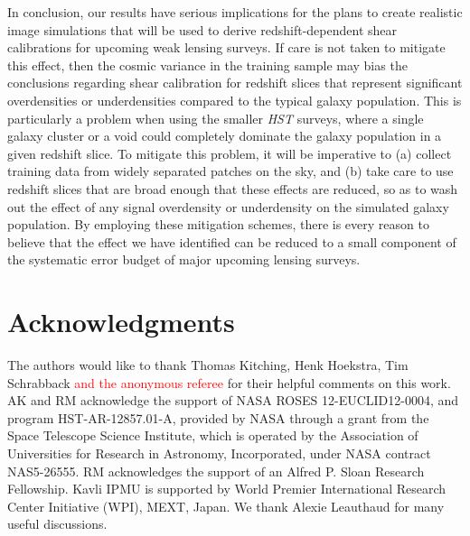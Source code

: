 \documentclass[twocolumn,useAMS,usenatbib]{mn2e}
\newcommand{\new}[1]{{\textcolor{red}{#1}}}
\begin{document}
In conclusion, our results have serious implications for the plans to
create realistic image simulations that will be used to derive
redshift-dependent shear calibrations for upcoming weak lensing
surveys.  If care is not taken to mitigate this effect, then the
cosmic variance in the training sample may bias the conclusions
regarding shear calibration for redshift slices that represent
significant overdensities or underdensities compared to the typical
galaxy population.  This is particularly a problem when using the
smaller {\em HST} surveys, where a single galaxy cluster or a void
could completely dominate the galaxy population in a given redshift
slice.  To mitigate this problem, it will be imperative to (a) collect
training data from widely separated patches on the sky, and (b) take
care to use redshift slices that are broad enough that these effects
are reduced, so as to wash out the effect of any signal overdensity or
underdensity on the simulated galaxy population.  By employing these
mitigation schemes, there is every reason to believe that the effect
we have identified can be reduced to a small component of the
systematic error budget of major upcoming lensing surveys.


\section*{Acknowledgments}

The authors would like to thank Thomas Kitching, Henk
  Hoekstra, Tim Schrabback \new{and the anonymous referee} for their helpful comments on this work.
AK and RM acknowledge the support of NASA ROSES 12-EUCLID12-0004, and
program HST-AR-12857.01-A, provided by NASA through a grant from the
Space Telescope Science Institute, which is operated by the
Association of Universities for Research in Astronomy, Incorporated,
under NASA contract NAS5-26555. RM acknowledges the support of an Alfred P. Sloan Research Fellowship. 
Kavli IPMU is supported by World Premier International Research Center Initiative (WPI), MEXT, Japan.
We thank Alexie Leauthaud for 
many useful discussions.



\end{document}
